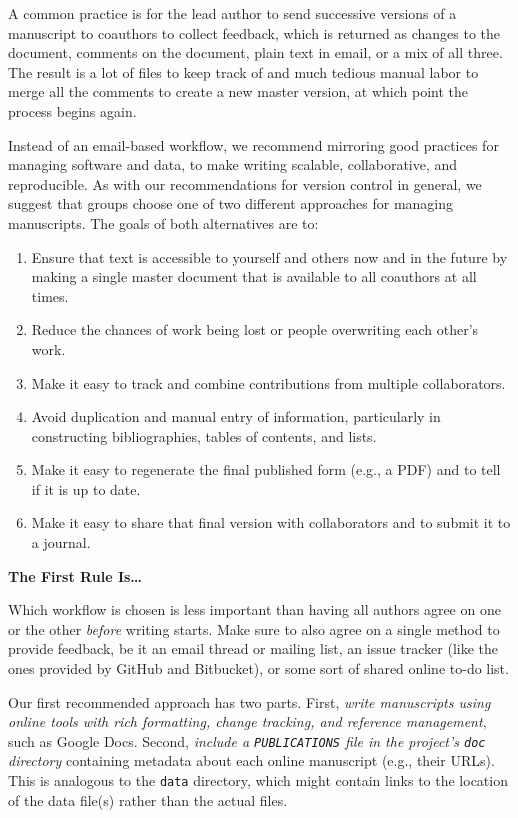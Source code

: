 \documentclass[10pt]{article}
\newcommand{\recommend}[1]{\textit{#1}}
\begin{document}
A common practice is for the lead author to send successive versions of
a manuscript to coauthors to collect feedback, which is returned as
changes to the document, comments on the document, plain text in email,
or a mix of all three. The result is a lot of files to keep track of and
much tedious manual labor to merge all the comments to create a new
master version, at which point the process begins again.

Instead of an email-based workflow, we recommend mirroring good
practices for managing software and data, to make writing scalable,
collaborative, and reproducible. As with our recommendations for version
control in general, we suggest that groups choose one of two different
approaches for managing manuscripts. The goals of both alternatives are
to:

\begin{enumerate}
\item
  Ensure that text is accessible to yourself and others now and in the
  future by making a single master document that is available to all
  coauthors at all times.
\item
  Reduce the chances of work being lost or people overwriting each
  other's work.
\item
  Make it easy to track and combine contributions from multiple
  collaborators.
\item
  Avoid duplication and manual entry of information, particularly in
  constructing bibliographies, tables of contents, and lists.
\item
  Make it easy to regenerate the final published form (e.g., a PDF) and
  to tell if it is up to date.
\item
  Make it easy to share that final version with collaborators and to
  submit it to a journal.
\end{enumerate}

\begin{framed}
\noindent \textbf{The First Rule Is{\ldots}}

Which workflow is chosen is less important than having all authors agree
on one or the other \emph{before} writing starts. Make sure to also
agree on a single method to provide feedback, be it an email thread or
mailing list, an issue tracker (like the ones provided by GitHub and
Bitbucket), or some sort of shared online to-do list.
\end{framed}

Our first recommended approach has two parts.  First, \recommend{write
  manuscripts using online tools with rich formatting, change
  tracking, and reference management}, such as Google Docs.  Second,
\recommend{include a \texttt{PUBLICATIONS} file in the project's
  \texttt{doc} directory} containing metadata about each online
manuscript (e.g., their URLs). This is analogous to the \texttt{data}
directory, which might contain links to the location of the data
file(s) rather than the actual files.
\end{document}
